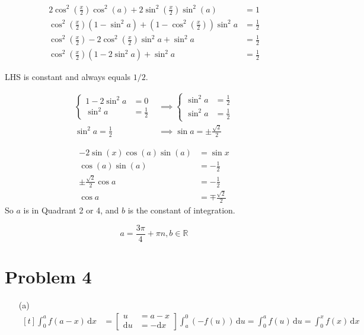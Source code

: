 \documentclass{article}
\newcommand*{\problem}[1]{\section*{Problem #1}}
\begin{document}
\begin{minipage}[t]{0.59\linewidth}
	\begin{align*}
		2\cos^2\left(\frac{x}{2}\right)\cos^2(a)+2\sin^2\left(\frac{x}{2}\right)\sin^2(a)&=1 \\
		\cos^2 \left(\frac x2\right)\left(1-\sin^2a\right)+\left(1-\cos^2 \left(\frac x2\right)\right)\sin^2a&=\frac12 \\
		\cos^2 \left(\frac x2\right)-2\cos^2 \left(\frac x2\right)\sin^2a+\sin^2a&=\frac12 \\
		\cos^2 \left(\frac x2\right)\left(1-2\sin^2a\right)+\sin^2a&=\frac12
	\end{align*}

	LHS is constant and always equals $1/2$.

	\begin{align*}
		\left\{
			\begin{aligned}
				1-2\sin^2a&=0 \\
				\sin^2a&=\frac12
			\end{aligned}
		\right.
		&\implies
		\left\{
			\begin{aligned}
				\sin^2a&=\frac12 \\
				\sin^2a&=\frac12
			\end{aligned}
		\right. \\
	    \sin^2a=\frac12
		&\implies \sin a=\pm\frac{\sqrt{2}}{2}
	\end{align*}
\end{minipage}
\begin{minipage}[t]{0.4\linewidth}
	\begin{align*}
		-2\sin(x)\cos(a)\sin(a)&=\sin x \\
		\cos(a)\sin(a)&=-\frac12 \\
		\pm\frac{\sqrt{2}}{2}\cos a&=-\frac12 \\
		\cos a&=\mp\frac{\sqrt{2}}{2}
	\end{align*}
	So $a$ is in Quadrant 2 or 4, and $b$ is the constant of integration.

	\begin{equation*}
		\boxed{a=\frac{3\pi}{4}+\pi n,b\in\mathbb R}
	\end{equation*}
\end{minipage}

\problem{4}
\begin{itemize}
	\item[(a)]
		$\begin{aligned}[t]
			\int_{0}^{a}f(a-x)\,\mathrm{d}x
			&=\left[\begin{aligned}
					u&=a-x \\
					\mathrm{d}u&=-\mathrm{d}x
			\end{aligned}\right]
			\int_{a}^{0}(-f(u))\,\mathrm{d}u
			=\int_{0}^{a}f(u)\,\mathrm{d}u
			=\int_{0}^{x}f(x)\,\mathrm{d}x
		\end{aligned}$
\end{itemize}
\end{document}
